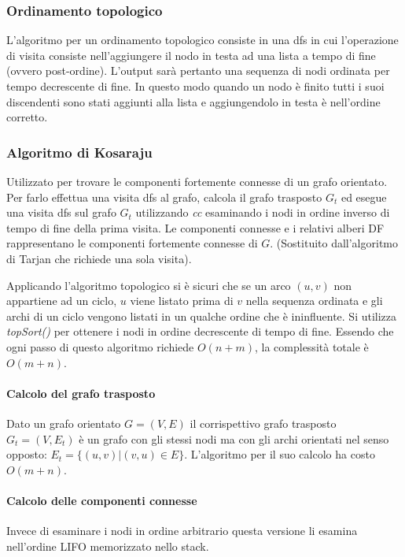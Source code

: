 \subsubsection{Ordinamento topologico}
L'algoritmo per un ordinamento topologico consiste in una dfs in cui l'operazione di visita consiste nell'aggiungere il nodo in testa ad una lista a tempo
di fine (ovvero post-ordine). L'output sar\`a pertanto una sequenza di nodi ordinata per tempo decrescente di fine. In questo modo quando un nodo \`e finito
tutti i suoi discendenti sono stati aggiunti alla lista e aggiungendolo in testa \`e nell'ordine corretto. 

\subsubsection{Algoritmo di Kosaraju}
Utilizzato per trovare le componenti fortemente connesse di un grafo orientato. Per farlo effettua una visita dfs al grafo, calcola il grafo trasposto $G_t$
ed esegue una visita dfs sul grafo $G_t$ utilizzando \emph{cc} esaminando i nodi in ordine inverso di tempo di fine della prima visita. Le componenti 
connesse e i relativi alberi DF rappresentano le componenti fortemente connesse di $G$. (Sostituito dall'algoritmo di Tarjan che richiede una sola visita).

Applicando l'algoritmo topologico si \`e sicuri che se un arco $(u, v)$ non appartiene ad un ciclo, $u$ viene listato prima di $v$ nella sequenza ordinata e
gli archi di un ciclo vengono listati in un qualche ordine che \`e ininfluente. Si utilizza \emph{topSort()} per ottenere i nodi in ordine decrescente di 
tempo di fine. Essendo che ogni passo di questo algoritmo richiede $O(n+m)$, la complessit\`a totale \`e $O(m+n)$.
\paragraph{Calcolo del grafo trasposto}
Dato un grafo orientato $G=(V, E)$ il corrispettivo grafo trasposto $G_t=(V, E_t)$ \`e un grafo con gli stessi nodi ma con gli archi orientati nel senso 
opposto: $E_t=\{(u, v)|(v, u)\in E\}$. L'algoritmo per il suo calcolo ha costo $O(m+n)$.

\newpage
\paragraph{Calcolo delle componenti connesse}
Invece di esaminare i nodi in ordine arbitrario questa versione li esamina nell'ordine LIFO memorizzato nello stack.
\begin{multicols}{2}

\columnbreak

\end{multicols}
